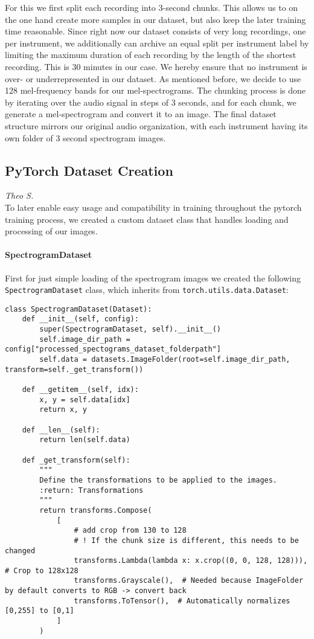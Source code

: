 For this we first split each recording into 3-second chunks. This allows us to on the one hand create more samples in our dataset, but also keep the later training time reasonable.
Since right now our dataset consists of very long recordings, one per instrument, we additionally can archive an equal split per instrument label by limiting the maximum duration of each recording by the length of the shortest recording.
This is 30 minutes in our case.
We hereby ensure that no instrument is over- or underrepresented in our dataset.
As mentioned before, we decide to use 128 mel-frequency bands for our mel-spectrograms.
The chunking process is done by iterating over the audio signal in steps of 3 seconds, and for each chunk, we generate a mel-spectrogram and convert it to an image.
The final dataset structure mirrors our original audio organization, with each instrument having its own folder of 3 second spectrogram images.




\subsection{PyTorch Dataset Creation}
\textit{Theo S.}\\
To later enable easy usage and compatibility in training throughout the pytorch training process, we created a custom dataset class that handles loading and processing of our images.

\paragraph{SpectrogramDataset}
First for just simple loading of the spectrogram images we created the following \texttt{SpectrogramDataset} class, which inherits from \texttt{torch.utils.data.Dataset}:

\begin{lstlisting}[caption=Custom Dataset Class]
class SpectrogramDataset(Dataset):
    def __init__(self, config):
        super(SpectrogramDataset, self).__init__()
        self.image_dir_path = config["processed_spectograms_dataset_folderpath"]
        self.data = datasets.ImageFolder(root=self.image_dir_path, transform=self._get_transform())

    def __getitem__(self, idx):
        x, y = self.data[idx]
        return x, y

    def __len__(self):
        return len(self.data)

    def _get_transform(self):
        """
        Define the transformations to be applied to the images.
        :return: Transformations
        """
        return transforms.Compose(
            [
                # add crop from 130 to 128
                # ! If the chunk size is different, this needs to be changed
                transforms.Lambda(lambda x: x.crop((0, 0, 128, 128))),  # Crop to 128x128
                transforms.Grayscale(),  # Needed because ImageFolder by default converts to RGB -> convert back
                transforms.ToTensor(),  # Automatically normalizes [0,255] to [0,1]
            ]
        )

\end{lstlisting}


